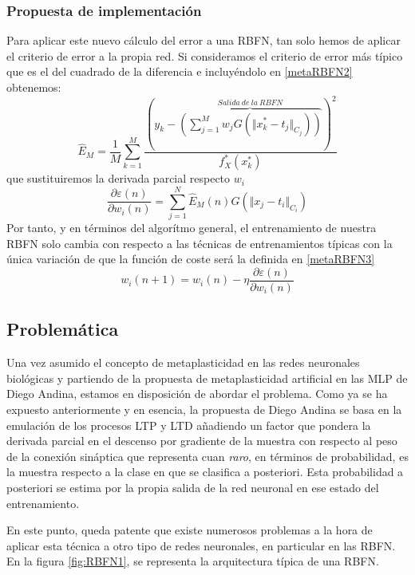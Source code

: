 \documentclass[10pt,a4paper]{report}
\begin{document}
\subsubsection{Propuesta de implementación}
Para aplicar este nuevo cálculo del error a una RBFN, tan solo hemos de aplicar el criterio de error a la propia red. Si consideramos el criterio de error más típico que es el del cuadrado de la diferencia e incluyéndolo en \ref{metaRBFN2} obtenemos:
\begin{equation}
	\label{metaRBFN3}
	\widehat{E}_M=\dfrac{1}{M}\sum^M_{k=1}\dfrac{(y_k - \overbrace{\left(\sum^M_{j=1}{w_j G(\Vert x^*_k - t_j \Vert_{C_j})}\right)}^{Salida\ de\ la\ RBFN})^2}{f^*_X(x^*_k)}
\end{equation}
que sustituiremos la derivada parcial respecto $w_i$
\begin{equation}
	\dfrac{\partial\varepsilon(n)}{\partial w_i(n)} = \sum^N_{j=1}{\widehat{E}_M(n) G(\Vert x_j - t_i \Vert_{C_i})}
\end{equation}
Por tanto, y en términos del algorítmo general, el entrenamiento de nuestra RBFN solo cambia con respecto a las técnicas de entrenamientos típicas con la única variación de que la función de coste será la definida en \ref{metaRBFN3}
\begin{equation}
	w_i(n+1)=w_i(n) - \eta \dfrac{\partial\varepsilon(n)}{\partial w_i(n)}
\end{equation}

\subsection{Problemática}
Una vez asumido el concepto de metaplasticidad en las redes neuronales biológicas y partiendo de la propuesta de metaplasticidad artificial en las MLP de Diego Andina, estamos en disposición de abordar el problema. 
Como ya se ha expuesto anteriormente y en esencia, la propuesta de Diego Andina se basa en la emulación de los procesos LTP y LTD añadiendo un factor que pondera la derivada parcial en el descenso por gradiente de la muestra con respecto al peso de la conexión sináptica que representa cuan \textit{raro}, en términos de probabilidad, es la muestra respecto a la clase en que se clasifica a posteriori. Esta probabilidad a posteriori se estima por la propia salida de la red neuronal en ese estado del entrenamiento. 

En este punto, queda patente que existe numerosos problemas a la hora de aplicar esta técnica a otro tipo de redes neuronales, en particular en las RBFN. En la figura \ref{fig:RBFN1}, se representa la arquitectura típica de una RBFN.
\end{document}
